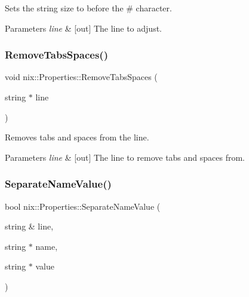Sets the string size to before the \textquotesingle{}\#\textquotesingle{} character. 


\begin{DoxyParams}{Parameters}
{\em line} & \mbox{[}out\mbox{]} The line to adjust. \\
\hline
\end{DoxyParams}
\mbox{\label{classnix_1_1Properties_a46ce937be586f08a66eda8a9b3cfca55}} 
\subsubsection{\texorpdfstring{Remove\+Tabs\+Spaces()}{RemoveTabsSpaces()}}
{\footnotesize\ttfamily void nix\+::\+Properties\+::\+Remove\+Tabs\+Spaces (\begin{DoxyParamCaption}\item[{string $\ast$}]{line }\end{DoxyParamCaption})\hspace{0.3cm}{\ttfamily [static]}}



Removes tabs and spaces from the line. 


\begin{DoxyParams}{Parameters}
{\em line} & \mbox{[}out\mbox{]} The line to remove tabs and spaces from. \\
\hline
\end{DoxyParams}
\mbox{\label{classnix_1_1Properties_aa6c42419ed1bfaa7ae0736d1e72a2fab}} 
\subsubsection{\texorpdfstring{Separate\+Name\+Value()}{SeparateNameValue()}}
{\footnotesize\ttfamily bool nix\+::\+Properties\+::\+Separate\+Name\+Value (\begin{DoxyParamCaption}\item[{string \&}]{line,  }\item[{string $\ast$}]{name,  }\item[{string $\ast$}]{value }\end{DoxyParamCaption})\hspace{0.3cm}{\ttfamily [static]}}



